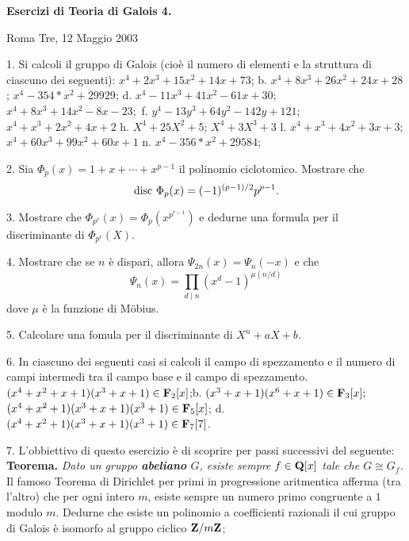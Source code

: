  \nopagenumbers
\def\frac#1#2{{#1\over#2}}
\def\Q{{\bf Q}}
\def\Z{{\bf Z}}
\def\N{{\bf N}}
\def\C{{\bf C}}
\def\F{{\bf F}}
\def\QQ{{\rm Q}}


\centerline{{\bf Esercizi di Teoria di Galois 4.}}\medskip

\centerline{Roma Tre, 12 Maggio 2003}\bigskip

\item{1.} Si calcoli il gruppo di Galois (cio\`{e} il numero di
elementi e la struttura di ciascuno dei seguenti):
 $x^4 + 2x^3 + 15x^2 + 14x + 73$;  %
 \hfill{b.} $x^4 + 8x^3 + 26x^2 + 24x + 28$;   %
 $x^4 - 354*x^2 + 29929$;  %
\hfill{d.} $x^4 - 11x^3 + 41x^2 - 61x + 30$; %
 $x^4 + 8x^3 + 14x^2 - 8x - 23;$  %
\hfill{f.} $y^4 - 13y^3 + 64y^2 - 142y + 121$; %
 $x^4 + x^3 + 2x^2 + 4x + 2$  %
\hfill{h.} $X^4+25X^2+5$; %
 $X^4+3X^3+3$
\hfill{l.} $ x^4 + x^3 + 4x^2 + 3x + 3$;
 $x^4 + 60x^3 + 99x^2 + 60x + 1$ %
\hfill{n.} $ x^4 - 356*x^2 + 29584$; %
\bigskip

\item{2.} Sia $\Phi_p(x)=1+x+\cdots+x^{p-1}$ il polinomio ciclotomico. Mostrare che
$${\rm disc}\ \Phi_p(x)=(-1)^{(p-1)/2}p^{p-1}.$$
\bigskip

\item{3.} Mostrare che $\Phi_{p^r}(x)=\Phi_{p}(x^{p^{r-1}})$ e dedurne una formula
per il discriminante di $\Phi_{p^r}(X)$.

\item{4.} Mostrare che se $n$ \`{e} dispari, allora $\Psi_{2n}(x)=\Psi_n(-x)$ e che
$$\Psi_n(x)=\prod_{d\mid n}(x^d-1)^{\mu(n/d)}$$
dove $\mu$ \`{e} la funzione di M\"{o}bius.

\item{5.} Calcolare una fomula per il discriminante di $X^n+aX+b$.

\item{6.} In ciascuno dei seguenti casi si calcoli il campo di spezzamento e il numero
di campi intermedi tra il campo base e il campo di spezzamento.
 $(x^4+x^2+x+1)(x^3+x+1)\in\F_2[x]$;\hfill b.
$(x^3+x+1)(x^6+x+1)\in \F_3[x];$
 $(x^4+x^2+1)(x^3+x+1)(x^3+1)\in\F_5[x]$; \hfill d. $(x^4+x^2+1)(x^3+x+1)(x^3+1)\in\F_7[7]$.

\bigskip

\item{7.} L'obbiettivo di questo esercizio \`{e} di scoprire
per passi successivi del seguente:\hfill\break
{\bf Teorema.} {\it Dato un gruppo {\bf abeliano} $G$, esiste
sempre $f\in\Q[x]$ tale che $G\cong G_f$.}\smallskip
{} Il famoso Teorema di Dirichlet per primi in progressione
aritmentica afferma (tra l'altro) che per ogni intero $m$, esiste sempre
un numero primo congruente a $1$ modulo $m$. Dedurne che esiste un polinomio
a coefficienti razionali il cui gruppo di Galois \`{e} isomorfo al gruppo ciclico $\Z/m\Z$;

